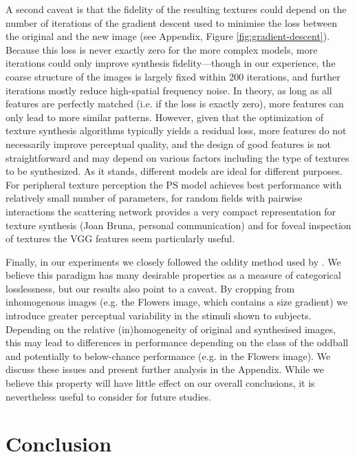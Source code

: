\documentclass[article, 11pt,a4paper,natbib]{apa6}\usepackage[]{graphicx}\usepackage[]{color}
\begin{document}
A second caveat is that the fidelity of the resulting textures could depend on the number of iterations of the gradient descent used to minimise the loss between the original and the new image (see Appendix, Figure \ref{fig:gradient-descent}).
Because this loss is never exactly zero for the more complex models, more iterations could only improve synthesis fidelity---though in our experience, the coarse structure of the images is largely fixed within 200 iterations, and further iterations mostly reduce high-spatial frequency noise.
In theory, as long as all features are perfectly matched (i.e. if the loss is exactly zero), more features can only lead to more similar patterns.
However, given that the optimization of texture synthesis algorithms typically yields a residual loss, more features do not necessarily improve perceptual quality, and the design of good features is not straightforward and may depend on various factors including the type of textures to be synthesized.
As it stands, different models are ideal for different purposes. 
For peripheral texture perception the PS model achieves best performance with relatively small number of parameters, for random fields with pairwise interactions the scattering network provides a very compact representation for texture synthesis (Joan Bruna, personal communication) and for foveal inspection of textures the VGG features seem particularly useful. 

Finally, in our experiments we closely followed the oddity method used by \citet{balas_texture_2006}.
We believe this paradigm has many desirable properties as a measure of categorical losslessness, but our results also point to a caveat.
By cropping from inhomogenous images (e.g. the Flowers image, which contains a size gradient) we introduce greater perceptual variability in the stimuli shown to subjects.
Depending on the relative (in)homogeneity of original and synthesised images, this may lead to differences in performance depending on the class of the oddball and potentially to below-chance performance (e.g. in the Flowers image).
We discuss these issues and present further analysis in the Appendix.
While we believe this property will have little effect on our overall conclusions, it is nevertheless useful to consider for future studies.

\section{Conclusion}
\end{document}
